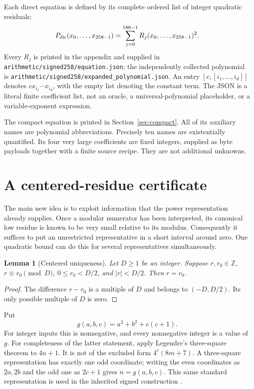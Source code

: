 \documentclass[11pt]{article}
\newcommand{\Z}{\mathbb Z}
\newcommand{\code}[1]{\nolinkurl{#1}}
\newtheorem{lemma}[theorem]{Lemma}
\theoremstyle{remark}
\numberwithin{equation}{section}
\begin{document}
Each direct equation is defined by its complete ordered list of integer quadratic residuals:
\begin{equation}\label{eq:sos}
P_{\mathrm{dir}}(x_0,\ldots,x_{258-1})
=\sum_{j=0}^{186-1} R_j(x_0,\ldots,x_{258-1})^2.
\end{equation}
Every $R_j$ is printed in the appendix and supplied in \code{arithmetic/signed258/equation.json}; the independently collected polynomial is \code{arithmetic/signed258/expanded_polynomial.json}. An entry $[c,[i_1,\ldots,i_d]]$ denotes $c x_{i_1}\cdots x_{i_d}$, with the empty list denoting the constant term. The JSON is a literal finite coefficient list, not an oracle, a universal-polynomial placeholder, or a variable-exponent expression.

The compact equation is printed in Section~\ref{sec:compact}. All of its auxiliary names are polynomial abbreviations. Precisely ten names are existentially quantified. Its four very large coefficients are fixed integers, supplied as byte payloads together with a finite source recipe. They are not additional unknowns.

\section{A centered-residue certificate}\label{sec:radius}

The main new idea is to exploit information that the power representation already supplies. Once a modular numerator has been interpreted, its canonical low residue is known to be very small relative to its modulus. Consequently it suffices to put an unrestricted representative in a short interval around zero. One quadratic bound can do this for several representatives simultaneously.

\begin{lemma}[Centered uniqueness]\label{lem:center}
Let $D\ge1$ be an integer. Suppose $r,r_0\in\Z$, $r\equiv r_0\pmod D$, $0\le r_0<D/2$, and $|r|<D/2$. Then $r=r_0$.
\end{lemma}
\begin{proof}
The difference $r-r_0$ is a multiple of $D$ and belongs to $(-D,D/2)$. Its only possible multiple of $D$ is zero.
\end{proof}

Put
\begin{equation}\label{eq:g}
g(a,b,c)=a^2+b^2+c(c+1).
\end{equation}
For integer inputs this is nonnegative, and every nonnegative integer is a value of $g$. For completeness of the latter statement, apply Legendre's three-square theorem to $4n+1$. It is not of the excluded form $4^e(8m+7)$. A three-square representation has exactly one odd coordinate; writing the even coordinates as $2a,2b$ and the odd one as $2c+1$ gives $n=g(a,b,c)$. This same standard representation is used in the inherited signed construction \cite{cofinal,sun}.
\end{document}
